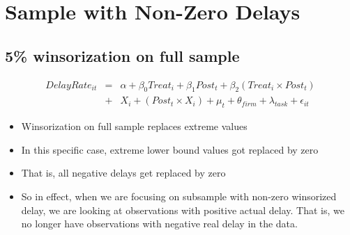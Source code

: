 \documentclass[
]{article}
\providecommand{\tightlist}{%
  \setlength{\itemsep}{0pt}\setlength{\parskip}{0pt}}
\begin{document}
\begin{table}[h]
\begin{center}
\caption{Logistic Regression: Two Quarter Delay}
\label{table:coefficients}
\end{center}
\end{table}

\hypertarget{sample-with-non-zero-delays}{%
\section{Sample with Non-Zero
Delays}\label{sample-with-non-zero-delays}}

\hypertarget{winsorization-on-full-sample}{%
\subsection{5\% winsorization on full
sample}\label{winsorization-on-full-sample}}

\[ \begin{aligned} DelayRate_{it} &=& \alpha+\beta_0 Treat_i + \beta_1 Post_t + \beta_2 (Treat_i \times Post_t)\\
&+&  X_i + (Post_t \times X_i) + \mu_t + \theta_{firm} + \lambda_{task}+ \epsilon_{it}
\end{aligned}\]

\begin{itemize}
\tightlist
\item
  Winsorization on full sample replaces extreme values
\item
  In this specific case, extreme lower bound values got replaced by zero
\item
  That is, all negative delays get replaced by zero
\item
  So in effect, when we are focusing on subsample with non-zero
  winsorized delay, we are looking at observations with positive actual
  delay. That is, we no longer have observations with negative real
  delay in the data.
\end{itemize}
\end{document}
